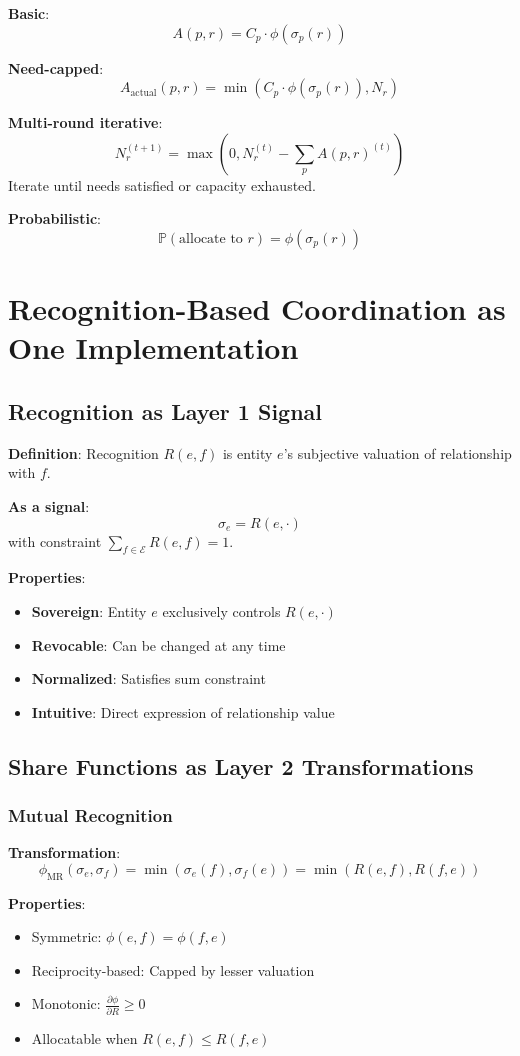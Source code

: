 \documentclass[11pt,a4paper]{article}
\theoremstyle{definition}
\theoremstyle{remark}
\newcommand{\E}{\mathcal{E}}
\begin{document}
\textbf{Basic}:
\[ A(p,r) = C_p \cdot \phi(\sigma_p(r)) \]

\textbf{Need-capped}:
\[ A_{\text{actual}}(p,r) = \min(C_p \cdot \phi(\sigma_p(r)), N_r) \]

\textbf{Multi-round iterative}:
\[ N_r^{(t+1)} = \max(0, N_r^{(t)} - \sum_p A(p,r)^{(t)}) \]
Iterate until needs satisfied or capacity exhausted.

\textbf{Probabilistic}:
\[ \mathbb{P}(\text{allocate to } r) = \phi(\sigma_p(r)) \]

\section{Recognition-Based Coordination as One Implementation}

\subsection{Recognition as Layer 1 Signal}

\textbf{Definition}: Recognition $R(e,f)$ is entity $e$'s subjective valuation of relationship with $f$.

\textbf{As a signal}:
\[ \sigma_e = R(e, \cdot) \]
with constraint $\sum_{f \in \E} R(e,f) = 1$.

\textbf{Properties}:
\begin{itemize}
\item \textbf{Sovereign}: Entity $e$ exclusively controls $R(e, \cdot)$
\item \textbf{Revocable}: Can be changed at any time
\item \textbf{Normalized}: Satisfies sum constraint
\item \textbf{Intuitive}: Direct expression of relationship value
\end{itemize}

\subsection{Share Functions as Layer 2 Transformations}

\subsubsection{Mutual Recognition}

\textbf{Transformation}:
\[ \phi_{\text{MR}}(\sigma_e, \sigma_f) = \min(\sigma_e(f), \sigma_f(e)) = \min(R(e,f), R(f,e)) \]

\textbf{Properties}:
\begin{itemize}
\item Symmetric: $\phi(e,f) = \phi(f,e)$
\item Reciprocity-based: Capped by lesser valuation
\item Monotonic: $\frac{\partial \phi}{\partial R} \ge 0$
\item Allocatable when $R(e,f) \le R(f,e)$
\end{itemize}
\end{document}
